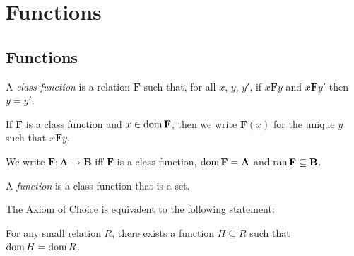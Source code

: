 \chapter{Functions}

\section{Functions}

\begin{definition}
    A \emph{class function} is a relation $\mathbf{F}$ such that, for all $x$, $y$,
    $y'$, if $x\mathbf{F}y$ and $x\mathbf{F}y'$ then $y = y'$.

    If $\mathbf{F}$ is a class function and $x \in \operatorname{dom} \mathbf{F}$, then we write
    $\mathbf{F}(x)$ for the unique $y$ such that $x \mathbf{F} y$.

    We write $\mathbf{F} : \mathbf{A} \rightarrow \mathbf{B}$ iff $\mathbf{F}$ is a class function,
    $\operatorname{dom} \mathbf{F} = \mathbf{A}$ and $\operatorname{ran} \mathbf{F} \subseteq \mathbf{B}$.

    A \emph{function} is a class function that is a set.
\end{definition}

\begin{theorem}
    \label{theorem:Axiom_of_Choice2}
    The Axiom of Choice is equivalent to the following statement:

    For any small relation $R$, there exists a function $H \subseteq R$ such that 
    $\operatorname{dom} H = \operatorname{dom} R$.
\end{theorem}


